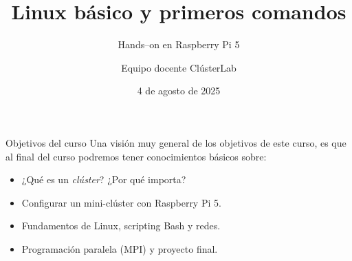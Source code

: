 \documentclass[aspectratio=169,professionalfonts]{beamer}
\title[ClústerLab • Día 1]{Linux básico y primeros comandos}
\subtitle{Hands--on en Raspberry Pi 5}
\author{Equipo docente ClústerLab}
\date{4 de agosto de 2025}
\begin{document}
\begin{frame}[plain]
  \titlepage
\end{frame}

\begin{frame}{Objetivos del curso}
  Una visión muy general de los objetivos de este curso, es que al final del curso podremos tener conocimientos básicos sobre:
  \begin{itemize}
    \item ¿Qué es un \emph{clúster}? ¿Por qué importa?
    \item Configurar un mini-clúster con Raspberry Pi 5.
    \item Fundamentos de Linux, scripting Bash y redes.
    \item Programación paralela (MPI) y proyecto final.
  \end{itemize}
\end{frame}
\end{document}
